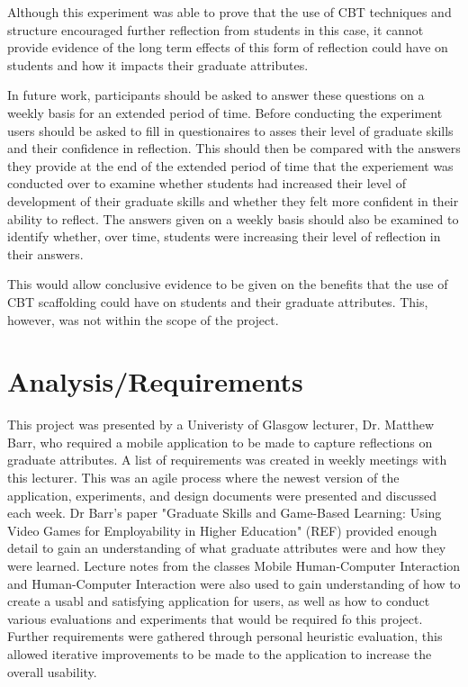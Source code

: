 \documentclass{l4proj}
\begin{document}
Although this experiment was able to prove that the use of CBT techniques and structure encouraged further reflection from students in this case, it cannot 
provide evidence of the long term effects of this form of reflection could have on students and how it impacts their graduate attributes. 

In future work, 
participants should be asked to answer these questions on a weekly basis for an extended period of time. Before conducting the experiment users should be asked
to fill in questionaires to asses their level of graduate skills and their confidence in reflection. This should then be compared with the answers they provide
at the end of the extended period of time that the experiement was conducted over to examine whether students had increased their level of development of their
graduate skills and whether they felt more confident in their ability to reflect. The answers given on a weekly basis should also be examined to identify 
whether, over time, students were increasing their level of reflection in their answers. 

This would allow conclusive evidence to be given on the benefits that the use of CBT scaffolding could have on students and their graduate attributes. This,
however, was not within the scope of the project.




\chapter{Analysis/Requirements}

This project was presented by a Univeristy of Glasgow lecturer, Dr. Matthew Barr, who required a mobile application to be made 
to capture reflections on graduate attributes. A list of requirements was created in weekly meetings with this lecturer.
This was an agile process where the newest version of the application, experiments, and design documents were presented
and discussed each week. Dr Barr's paper "Graduate Skills and Game-Based Learning: Using Video Games for Employability in Higher 
Education" (REF) provided enough detail to gain an understanding of what graduate attributes were and how they were learned. 
Lecture notes from the classes Mobile Human-Computer Interaction and Human-Computer Interaction were also used to gain understanding
of how to create a usabl and satisfying application for users, as well as how to conduct various evaluations and experiments that would
be required fo this project.
Further requirements were gathered through personal heuristic evaluation, this allowed iterative improvements to be made to the
application to increase the overall usability.
\end{document}
